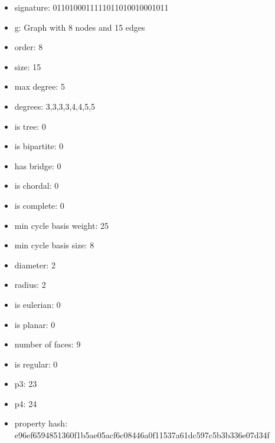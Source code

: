 \begin{itemize}
\item signature: 0110100011111011010010001011
\item g: Graph with 8 nodes and 15 edges
\item order: 8
\item size: 15
\item max degree: 5
\item degrees: 3,3,3,3,4,4,5,5
\item is tree: 0
\item is bipartite: 0
\item has bridge: 0
\item is chordal: 0
\item is complete: 0
\item min cycle basis weight: 25
\item min cycle basis size: 8
\item diameter: 2
\item radius: 2
\item is eulerian: 0
\item is planar: 0
\item number of faces: 9
\item is regular: 0
\item p3: 23
\item p4: 24
\item property hash: e96ef6594851360f1b5ae05acf6c08446a0f11537a61dc597c5b3b336e07d34f
\end{itemize}
\newpage
\begin{figure}
\end{figure}
